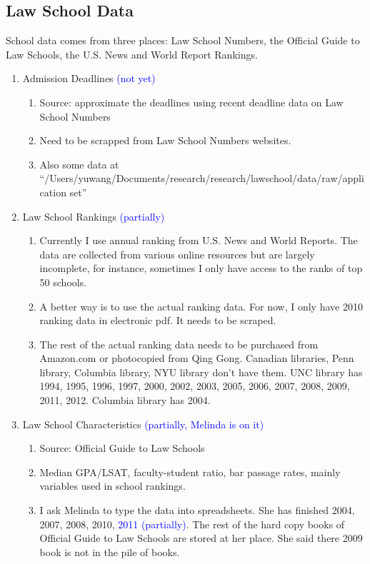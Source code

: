 \documentclass[12pt]{article}
\begin{document}
\subsection{Law School Data}
School data comes from three places: Law School Numbers, the Official Guide to Law Schools, the U.S. News and World Report Rankings. 
\begin{enumerate}
\item Admission Deadlines \textcolor{blue}{(not yet)}
\begin{enumerate}
\item Source: approximate the deadlines using recent deadline data on Law School Numbers
\item Need to be scrapped from Law School Numbers websites. 
\item Also some data at ``/Users/yuwang/Documents/research/research/lawschool/data/raw/application set''
\end{enumerate}
\item Law School Rankings \textcolor{blue}{(partially)}
\begin{enumerate}
\item Currently I use annual ranking from U.S. News and World Reports. The data are collected from various online resources but are largely incomplete, for instance, sometimes I only have access to the ranks of top 50 schools.
\item A better way is to use the actual ranking data. For now, I only have 2010 ranking data in electronic pdf. It needs to be scraped.
\item The rest of the actual ranking data needs to be purchased from Amazon.com or photocopied from Qing Gong. Canadian libraries, Penn library, Columbia library, NYU library don't have them. UNC library has 1994, 1995, 1996, 1997, 2000, 2002, 2003, 2005, 2006, 2007, 2008, 2009, 2011, 2012. Columbia library has 2004. 
\end{enumerate}
\item Law School Characteristics \textcolor{blue}{(partially, Melinda is on it)}
\begin{enumerate}
\item Source: Official Guide to Law Schools
\item Median GPA/LSAT, faculty-student ratio, bar passage rates, mainly variables used in school rankings. 
\item I ask Melinda to type the data into spreadsheets. She has finished 2004, 2007, 2008, 2010, \textcolor{blue}{2011 (partially)}. The rest of the hard copy books of Official Guide to Law Schools are stored at her place. She said there 2009 book is not in the pile of books.

\end{enumerate}
\end{enumerate}
\end{document}
